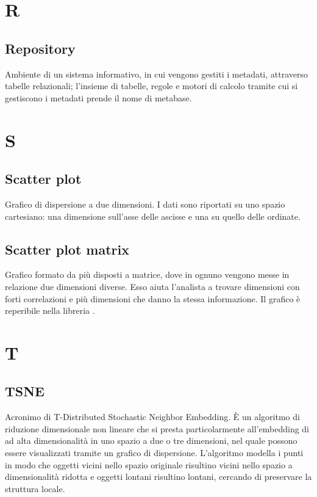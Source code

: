 \section*{R}

\subsection*{Repository}
Ambiente di un sistema informativo, in cui vengono gestiti i metadati, attraverso tabelle relazionali; l'insieme di tabelle, regole e motori di calcolo tramite cui si gestiscono i metadati prende il nome di metabase.

\section*{S}

\subsection*{Scatter plot}
Grafico di dispersione a due dimensioni. I dati sono riportati su uno spazio cartesiano: una dimensione sull'asse delle ascisse e una su quello delle ordinate.

\subsection*{Scatter plot matrix}
Grafico formato da più  disposti a matrice, dove in ognuno vengono messe in relazione due dimensioni diverse. Esso aiuta l'analista a trovare dimensioni con forti correlazioni e più  dimensioni che danno la stessa informazione. Il grafico è reperibile nella libreria .

\section*{T}

\subsection*{TSNE}
Acronimo di T-Distributed Stochastic Neighbor Embedding. È un algoritmo di riduzione dimensionale non lineare che si presta particolarmente all'embedding di  ad alta dimensionalità in uno spazio a due o tre dimensioni, nel quale possono essere visualizzati tramite un grafico di dispersione. L'algoritmo modella i punti in modo che oggetti vicini nello spazio originale risultino vicini nello spazio a dimensionalità ridotta e oggetti lontani risultino lontani, cercando di preservare la struttura locale.
